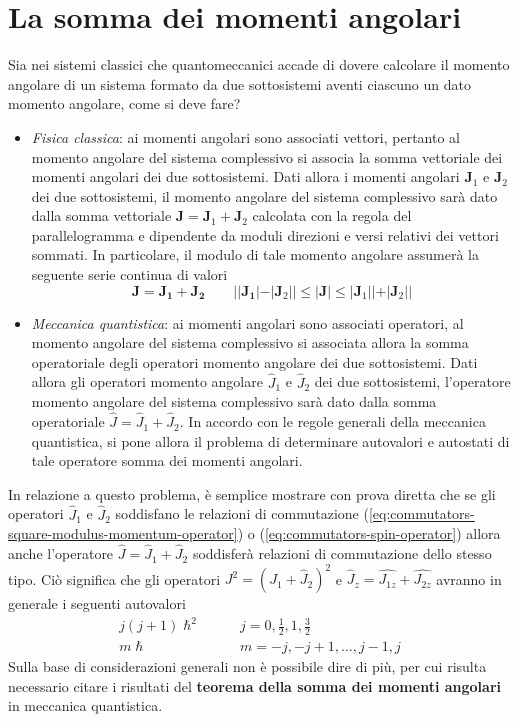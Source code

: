 \section{La somma dei momenti angolari}\label{sec:somma-dei-momenti-angolari}

Sia nei sistemi classici che quantomeccanici accade di dovere calcolare
il momento angolare di un sistema formato da due sottosistemi aventi
ciascuno un dato momento angolare, come si deve fare?

\begin{itemize}
    \tightlist
    \item
    \emph{Fisica classica}: ai momenti angolari sono associati vettori,
    pertanto al momento angolare del sistema complessivo si associa la
    somma vettoriale dei momenti angolari dei due sottosistemi.
    Dati
    allora i momenti angolari \(\bm{J}_{1}\) e \(\bm{J}_{2}\) dei due
    sottosistemi, il momento angolare del sistema complessivo sarà dato
    dalla somma vettoriale \(\bm{J} = \bm{J}_{1}+ \bm{J}_{2}\) calcolata
    con la regola del parallelogramma e dipendente da moduli direzioni e
    versi relativi dei vettori sommati.
    In particolare, il modulo di tale
    momento angolare assumerà la seguente serie continua di valori \[
                                                                        \bm{J} = \bm{J_{1}} + \bm{J_{2}} \qquad | |\bm{J_{1}}| - |\bm{J}_{2}| | \leq | \bm{J}| \leq|\bm{J}_{1} | | + | \bm{J}_{2} | |
    \]
    \item \emph{Meccanica quantistica}: ai momenti angolari sono associati
    operatori, al momento angolare del sistema complessivo si associata
    allora la somma operatoriale degli operatori momento angolare dei due
    sottosistemi.
    Dati allora gli operatori momento angolare
    \(\hat{J}_{1}\) e \(\hat{J}_{2}\) dei due sottosistemi, l'operatore
    momento angolare del sistema complessivo sarà dato dalla somma
    operatoriale \(\hat{J} = \hat{J}_{1}+ \hat{J}_{2}\).
    In accordo con le
    regole generali della meccanica quantistica, si pone allora il
    problema di determinare autovalori e autostati di tale operatore somma
    dei momenti angolari.
\end{itemize}

In relazione a questo problema, è semplice mostrare con prova diretta
che se gli operatori \(\hat{J}_{1}\) e \(\hat{J}_{2}\) soddisfano le
relazioni di commutazione (\ref{eq:commutators-square-modulus-momentum-operator}) o (\ref{eq:commutators-spin-operator})
allora anche l'operatore
\(\hat{J} = \hat{J}_{1}+ \hat{J}_{2}\) soddisferà relazioni di
commutazione dello stesso tipo.
Ciò significa che gli operatori
\(J^{2} = (J_{1} + \hat{J}_{2})^{2}\) e
\(\hat{J}_{z} = \hat{J_{1z}} + \hat{J_{2z}}\) avranno in generale i
seguenti autovalori
\begin{align*}
    j(j+1) \hslash^{2} \qquad & j = 0, \frac{1}{2}, 1, \frac{3}{2}\\
    m \hslash  \qquad \quad & m = -j , -j +1, \dots , j-1, j
\end{align*} Sulla base di considerazioni generali non è possibile dire di più,
per cui risulta necessario citare i risultati del \textbf{teorema della somma
dei momenti angolari} in meccanica quantistica.
\bigskip

